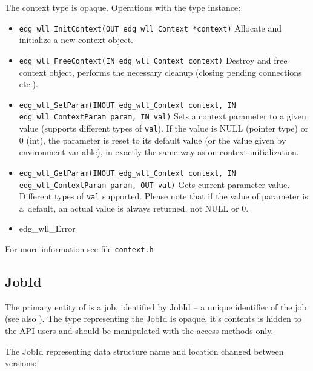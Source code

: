The context type is opaque. Operations with the type instance:
\begin{itemize}
  \item \texttt{edg\_wll\_InitContext(OUT edg\_wll\_Context *context)}
    Allocate and initialize a new context object.
  \item \texttt{edg\_wll\_FreeContext(IN edg\_wll\_Context context)}
    Destroy and free context object, performs the necessary cleanup
    (closing pending connections etc.).
  \item \texttt{edg\_wll\_SetParam(INOUT edg\_wll\_Context context, IN
    edg\_wll\_ContextParam param, IN val)} Sets a context parameter to
    a given value (supports different types of \texttt{val}). If the
    value is NULL (pointer type) or 0 (int), the parameter is reset to
    its default value (or the value given by environment variable), in
    exactly the same way as on context initialization.
  \item \texttt{edg\_wll\_GetParam(INOUT edg\_wll\_Context context, IN
    edg\_wll\_ContextParam param, OUT val)} Gets current parameter
    value. Different types of \texttt{val} supported. Please note that
    if the value of parameter is a~default, an actual value is always
    returned, not NULL or 0.
  \item edg\_wll\_Error 
\end{itemize}
For more information see file \texttt{context.h} 


\subsection{JobId} 
The primary entity of \LB is a job, identified by JobId -- a unique
identifier of the job (see also \cite{LBUG}). The type representing
the JobId is opaque, it's contents is hidden to the API users and
should be manipulated with the access methods only.

The JobId representing data structure name and location
changed between \LB versions:

